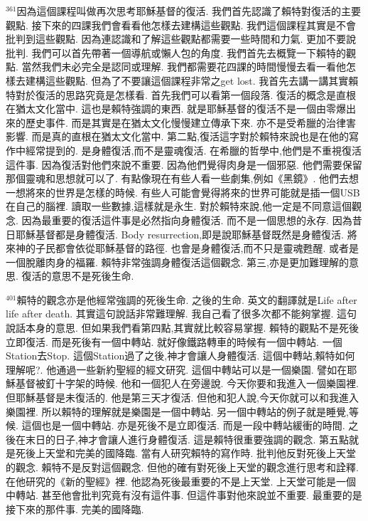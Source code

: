 \documentclass{book}
\begin{document}
$^{361}$因為這個課程叫做再次思考耶穌基督的復活.
我們首先認識了賴特對復活的主要觀點.
接下來的四課我們會看看他怎樣去建構這些觀點.
我們這個課程其實是不會批判到這些觀點.
因為連認識和了解這些觀點都需要一些時間和力氣.
更加不要說批判.
我們可以首先帶著一個導航或懶人包的角度.
我們首先去概覽一下賴特的觀點.
當然我們未必完全是認同或理解.
我們都需要花四課的時間慢慢去看一看他怎樣去建構這些觀點.
但為了不要讓這個課程非常之get lost.
我首先去講一講其實賴特對於復活的思路究竟是怎樣看.
首先我們可以看第一個段落.
復活的概念是直根在猶太文化當中.
這也是賴特強調的東西.
就是耶穌基督的復活不是一個由零爆出來的歷史事件.
而是其實是在猶太文化慢慢建立傳承下來.
亦不是受希臘的治律害影響.
而是真的直根在猶太文化當中.
第二點,復活這字對於賴特來說也是在他的寫作中經常提到的.
是身體復活,而不是靈魂復活.
在希臘的哲學中,他們是不重視復活這件事.
因為復活對他們來說不重要.
因為他們覺得肉身是一個邪惡.
他們需要保留那個靈魂和思想就可以了.
有點像現在有些人看一些劇集,例如《黑鏡》.
他們去想一想將來的世界是怎樣的時候.
有些人可能會覺得將來的世界可能就是插一個USB在自己的腦裡.
讀取一些數據,這樣就是永生.
對於賴特來說,他一定是不同意這個觀念.
因為最重要的復活這件事是必然指向身體復活.
而不是一個思想的永存.
因為昔日耶穌基督都是身體復活.
Body resurrection,即是說耶穌基督既然是身體復活.
將來神的子民都會依從耶穌基督的路徑.
也會是身體復活,而不只是靈魂甦醒.
或者是一個脫離肉身的福羅.
賴特非常強調身體復活這個觀念.
第三,亦是更加難理解的意思.
復活的意思不是死後生命.

$^{401}$賴特的觀念亦是他經常強調的死後生命.
之後的生命.
英文的翻譯就是Life after life after death.
其實這句說話非常難理解.
我自己看了很多次都不能夠掌握.
這句說話本身的意思.
但如果我們看第四點,其實就比較容易掌握.
賴特的觀點不是死後立即復活.
而是死後有一個中轉站.
就好像鐵路轉車的時候有一個中轉站.
一個Station去Stop.
這個Station過了之後,神才會讓人身體復活.
這個中轉站,賴特如何理解呢?.
他通過一些新約聖經的經文研究.
這個中轉站可以是一個樂園.
譬如在耶穌基督被釘十字架的時候.
他和一個犯人在旁邊說.
今天你要和我進入一個樂園裡.
但耶穌基督是未復活的.
他是第三天才復活.
但他和犯人說,今天你就可以和我進入樂園裡.
所以賴特的理解就是樂園是一個中轉站.
另一個中轉站的例子就是睡覺,等候.
這個也是一個中轉站.
亦是死後不是立即復活.
而是一段中轉站緩衝的時間.
之後在末日的日子,神才會讓人進行身體復活.
這是賴特很重要強調的觀念.
第五點就是死後上天堂和完美的國降臨.
當有人研究賴特的寫作時.
批判他反對死後上天堂的觀念.
賴特不是反對這個觀念.
但他的確有對死後上天堂的觀念進行思考和詮釋.
在他研究的《新的聖經》裡.
他認為死後最重要的不是上天堂.
上天堂可能是一個中轉站.
甚至他會批判究竟有沒有這件事.
但這件事對他來說並不重要.
最重要的是接下來的那件事.
完美的國降臨.
\end{document}
